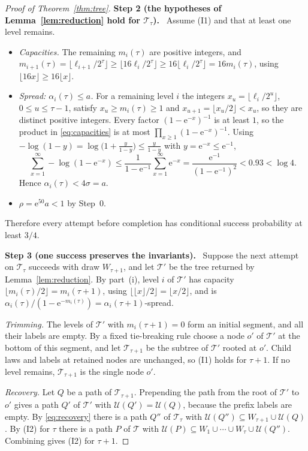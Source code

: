 \documentclass[11pt]{article}
\numberwithin{equation}{section}
\theoremstyle{remark}
\newcommand{\TT}{\mathcal T}
\newcommand{\UU}{\mathcal U}
\newcommand{\ee}{\mathrm e}
\newcommand{\step}[1]{\par\medskip\noindent\textbf{#1}\ }
\begin{document}
\begin{proof}[Proof of Theorem~\ref{thm:tree}]
\step{Step 2 (the hypotheses of Lemma~\ref{lem:reduction} hold for
$\TT_\tau$).} Assume (I1) and that at least one level remains.
\begin{itemize}[leftmargin=2em,itemsep=2pt]
 \item \emph{Capacities.} The remaining $m_i(\tau)$ are positive
 integers, and
 $m_{i+1}(\tau)=\lfloor\ell_{i+1}/2^\tau\rfloor
 \ge\lfloor16\ell_i/2^\tau\rfloor\ge16\lfloor\ell_i/2^\tau\rfloor
 =16m_i(\tau)$, using $\lfloor16x\rfloor\ge16\lfloor x\rfloor$.
 \item \emph{Spread: $\alpha_i(\tau)\le a$.} For a remaining level $i$
 the integers $x_u=\lfloor\ell_i/2^u\rfloor$, $0\le u\le\tau-1$, satisfy
 $x_u\ge m_i(\tau)\ge1$ and
 $x_{u+1}=\lfloor x_u/2\rfloor<x_u$, so they are distinct positive
 integers. Every factor $(1-\ee^{-x})^{-1}$ is at least $1$, so the
 product in \eqref{eq:capacities} is at most
 $\prod_{x\ge1}(1-\ee^{-x})^{-1}$. Using
 $-\log(1-y)=\log\bigl(1+\tfrac y{1-y}\bigr)\le\tfrac y{1-y}$ with
 $y=\ee^{-x}\le\ee^{-1}$,
 \begin{equation}\label{eq:spread-iteration}
 \sum_{x=1}^{\infty}-\log(1-\ee^{-x})
 \le \frac{1}{1-\ee^{-1}}\sum_{x=1}^{\infty}\ee^{-x}
 =\frac{\ee^{-1}}{(1-\ee^{-1})^2}<0.93<\log 4 .
 \end{equation}
 Hence $\alpha_i(\tau)<4\sigma=a$.
 \item $\rho=\ee^{50}a<1$ by Step~0.
\end{itemize}
Therefore every attempt before completion has conditional success
probability at least $3/4$.

\step{Step 3 (one success preserves the invariants).} Suppose the next
attempt on $\TT_\tau$ succeeds with draw $W_{\tau+1}$, and let $\TT'$ be
the tree returned by Lemma~\ref{lem:reduction}. By part~(i), level $i$
of $\TT'$ has capacity
$\lfloor m_i(\tau)/2\rfloor=m_i(\tau+1)$, using
$\lfloor\lfloor x\rfloor/2\rfloor=\lfloor x/2\rfloor$, and is
$\alpha_i(\tau)/(1-\ee^{-m_i(\tau)})=\alpha_i(\tau+1)$-spread.

\emph{Trimming.} The levels of $\TT'$ with $m_i(\tau+1)=0$ form an
initial segment, and all their labels are empty. By a fixed tie-breaking
rule choose a node $o'$ of $\TT'$ at the bottom of this segment, and let
$\TT_{\tau+1}$ be the subtree of $\TT'$ rooted at $o'$. Child laws and
labels at retained nodes are unchanged, so (I1) holds for $\tau+1$. If
no level remains, $\TT_{\tau+1}$ is the single node $o'$.

\emph{Recovery.} Let $Q$ be a path of $\TT_{\tau+1}$. Prepending the
path from the root of $\TT'$ to $o'$ gives a path $Q'$ of $\TT'$ with
$\UU(Q')=\UU(Q)$, because the prefix labels are empty. By
\eqref{eq:recovery} there is a path $Q''$ of $\TT_\tau$ with
$\UU(Q'')\subseteq W_{\tau+1}\cup\UU(Q)$. By (I2) for $\tau$ there is a
path $P$ of $\TT$ with
$\UU(P)\subseteq W_1\cup\cdots\cup W_\tau\cup\UU(Q'')$. Combining gives
(I2) for $\tau+1$.


\end{proof}
\end{document}
